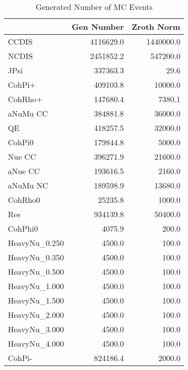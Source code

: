 
\begin{table}[h!]\centering
{\large{
\begin{tabular}{||l|r|r||}
\hline
\hline
      & Gen Number   & Zroth Norm  \\
\hline
  CCDIS               &  4116629.0 &  1440000.0 \\
  NCDIS               &  2451852.2 &   547200.0 \\
  JPsi                &   337363.3 &       29.6 \\
  CohPi+              &   409103.8 &    10000.0 \\
  CohRho+             &   147680.4 &     7380.1 \\
  aNuMu CC            &   384881.8 &    36000.0 \\
  QE                  &   418257.5 &    32000.0 \\
  CohPi0              &   179844.8 &     5000.0 \\
   Nue CC             &   396271.9 &    21600.0 \\
  aNue CC             &   193616.5 &     2160.0 \\
  aNuMu NC            &   189598.9 &    13680.0 \\
  CohRho0             &    25235.8 &     1000.0 \\
  Res                 &   934139.8 &    50400.0 \\
  CohPhi0             &     4075.9 &      200.0 \\
  HeavyNu\_0.250      &     4500.0 &      100.0 \\
  HeavyNu\_0.350      &     4500.0 &      100.0 \\
  HeavyNu\_0.500      &     4500.0 &      100.0 \\
  HeavyNu\_1.000      &     4500.0 &      100.0 \\
  HeavyNu\_1.500      &     4500.0 &      100.0 \\
  HeavyNu\_2.000      &     4500.0 &      100.0 \\
  HeavyNu\_3.000      &     4500.0 &      100.0 \\
  HeavyNu\_4.000      &     4500.0 &      100.0 \\
  CohPi-              &   824186.4 &     2000.0 \\
\hline
\hline
\end{tabular}
\caption{Generated Number of MC Events}
\label{tab-gen-numbers}
}}
\end{table}
\endinput
